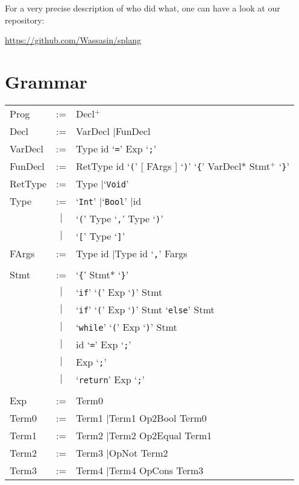\documentclass[14pt]{amsart}
\begin{document}
For a very precise description of who did what, one can have a look at our repository:

\url{https://github.com/Wassasin/splang}

\newpage
\appendix
\section{Grammar}

\newcommand{\tok}[1]{`\texttt{#1}'}
\newcommand{\I}{\hspace{0.1cm}$\mid$\hspace{0.2cm}}

\begin{tabular}[t]{p{2.5cm} c p{10cm}}
Prog		& := & Decl$^+$					\\
Decl		& := & VarDecl \I FunDecl			\\
VarDecl		& := & Type id \tok{=} Exp \tok{;}		\\
FunDecl		& := & RetType id \tok{(} [ FArgs ] \tok{)} \tok{\{} VarDecl* Stmt$^+$ \tok{\}} \\
RetType		& := & Type \I \tok{Void}			\\
Type		& := & \tok{Int} \I \tok{Bool} \I id		\\
		& \I & \tok{(} Type \tok{,} Type \tok{)}	\\
		& \I & \tok{[} Type \tok{]}			\\
FArgs		& := & Type id \I Type id \tok{,} Fargs		\\
&&\\
Stmt		& := & \tok{\{} Stmt* \tok{\}}			\\
		& \I & \tok{if} \tok{(} Exp \tok{)} Stmt	\\
		& \I & \tok{if} \tok{(} Exp \tok{)} Stmt \tok{else} Stmt \\
		& \I & \tok{while} \tok{(} Exp \tok{)} Stmt 	\\
		& \I & id \tok{=} Exp \tok{;}			\\
		& \I & Exp \tok{;}				\\
		& \I & \tok{return} Exp \tok{;}			\\
&&\\
Exp		& := & Term0					\\
Term0		& := & Term1 \I Term1 Op2Bool Term0		\\
Term1		& := & Term2 \I Term2 Op2Equal Term1		\\
Term2		& := & Term3 \I OpNot Term2			\\
Term3		& := & Term4 \I Term4 OpCons Term3		\\

\end{tabular}
\end{document}
